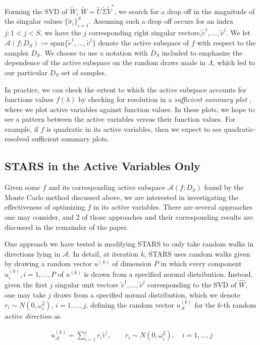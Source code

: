 \documentclass{amsart}
\newcommand{\A}{\mathcal{A}}
\begin{document}
Forming the SVD of $\tilde{W}$, $\tilde{W}=\tilde{U}\tilde{\Sigma}\tilde{V}^*$, we search for a drop off in the magnitude of the singular values $\{\tilde{\sigma}_i\}_{i=1}^S$. Assuming such a drop off occurs for an index $j:1<j<S$, we have the $j$ corresponding right singular vectors,$ \tilde{v}^1,\ldots,\tilde{v}^{j}$.  We let $\A\left(f; D_S \right):=\text{span}\{\tilde{v}^1,\ldots,\tilde{v}^{j}\}$ denote the active subspace of $f$ with respect to the samples $D_S$. We choose to use a notation with $D_S$ included to emphasize the dependence of the active subspace on the random draws made in $\Lambda$, which led to our particular $D_S$ set of samples.

In practice, we can check the extent to which the active subspace accounts for functions values $f(\lambda)$ 
by checking for resolution in a \emph{sufficient summary plot} \cite{Constantine2015}, where we plot active variables against function values. In these plots, we hope to see a pattern between the active variables versus their function values. For example, if $f$ is quadratic in its active variables, then we expect to see quadratic-resolved sufficient summary plots.



\subsection{STARS in the Active Variables Only} Given some $f$ and its corresponding active subspace $\A(f;D_S)$ found by the Monte Carlo method discussed above, we are interested in investigating the effectiveness of optimizing $f$ in its active variables. There are several approaches one may consider, and 2 of those approaches and their corresponding results are discussed in the remainder of the paper. 

One approach we have tested is modifying STARS to only take random walks in directions lying in $\A$. In detail, at iteration $k$, STARS uses random walks given by drawing a random vector $u^{(k)}$ of dimension $P$ in which every component $u_i^{(k)},i=1,\ldots,P$ of $u^{(k)}$ is  drawn from a specified normal distribution. Instead, given the first $j$ singular unit vectors $\tilde{v}^1,\ldots,\tilde{v}^j$ corresponding to the SVD of $\hat{W}$, one may take $j$ draws from a specified normal distribution, which we denote $r_i\sim N(0,\omega_i^2)$, $i=1,\ldots,j$, defining the random vector $u_\A^{(k)}$ for the $k$-th random \textit{active direction} as 

\begin{eqnarray}\label{eq:17}
u_\A^{(k)}=\sum_{i=1}^j r_i\tilde{v}^i, \quad \quad r_i\sim N(0,\omega_i^2), \quad i=1,\ldots,j
\end{eqnarray}
\end{document}
